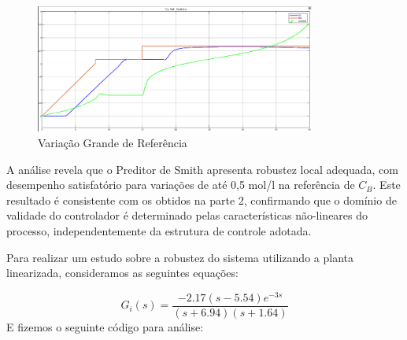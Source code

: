 \documentclass[a4paper,12pt]{article}
\begin{document}
\begin{figure}[H]
  \centering
  \includegraphics[width=0.82\textwidth]{figure8.png}
  \caption{Variação Grande de Referência}
  \end{figure}

A análise revela que o Preditor de Smith apresenta robustez local adequada, com desempenho satisfatório para variações de até 0,5 mol/l na referência de $C_B$. Este resultado é consistente com os obtidos na parte 2, confirmando que o domínio de validade do controlador é determinado pelas características não-lineares do processo, independentemente da estrutura de controle adotada.

Para realizar um estudo sobre a robustez do sistema utilizando a planta linearizada, consideramos as seguintes equações:

\[
G_i(s) = \frac{-2.17(s - 5.54)e^{-3s}}{(s + 6.94)(s + 1.64)}
\]
\newpage
E fizemos o seguinte código para análise:
\end{document}
